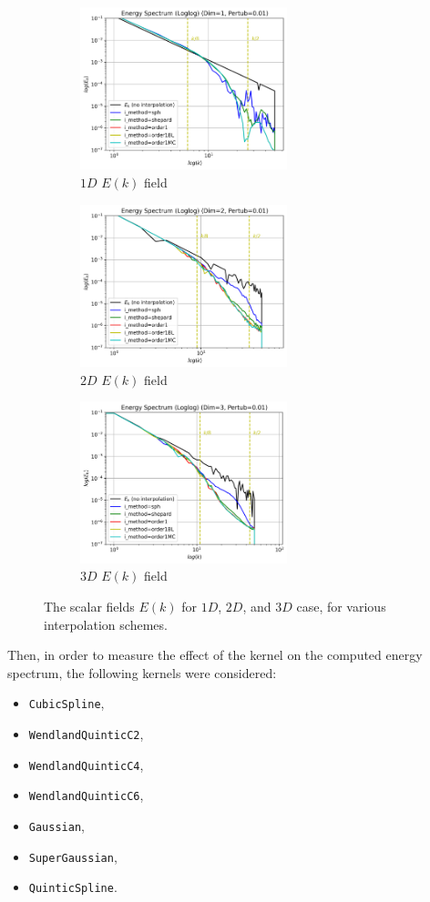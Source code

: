\begin{figure}[H]
	\begin{subfigure}{7cm}
		\centering\includegraphics[width=6cm]{Code-Figures/sin-vel-prof-i-methods/Energy Spectrum (Loglog) (Dim=1, Pertub=0.01).png}
		\caption{$1D$ $E(k)$ field}
	\end{subfigure}
	\begin{subfigure}{7cm}
		\centering\includegraphics[width=6cm]{Code-Figures/sin-vel-prof-i-methods/Energy Spectrum (Loglog) (Dim=2, Pertub=0.01).png}
		\caption{$2D$ $E(k)$ field}
	\end{subfigure}
	\begin{subfigure}{7cm}
		\centering\includegraphics[width=6cm]{Code-Figures/sin-vel-prof-i-methods/Energy Spectrum (Loglog) (Dim=3, Pertub=0.01).png}
		\caption{$3D$ $E(k)$ field}
	\end{subfigure}
	\caption{The scalar fields $E(k)$ for $1D$, $2D$, and $3D$ case, for various interpolation schemes.}
	\label{fig:espec-scalar-fields-i-methods}
\end{figure}

Then, in order to measure the effect of the kernel on the computed energy spectrum, the following kernels were considered:
\begin{itemize}
    \item \texttt{CubicSpline},
    \item \texttt{WendlandQuinticC2},
    \item \texttt{WendlandQuinticC4},
    \item \texttt{WendlandQuinticC6},
    \item \texttt{Gaussian},
    \item \texttt{SuperGaussian},
    \item \texttt{QuinticSpline}.
\end{itemize}

